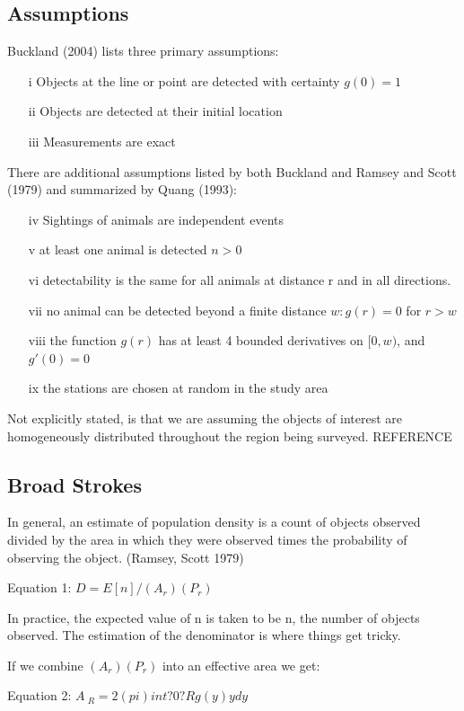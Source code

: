 \documentclass[12pt]{article}
\begin{document}
\subsection{Assumptions}
Buckland (2004) lists three primary assumptions:
\begin{enumerate}
\item[i] Objects at the line or point are detected with certainty $g(0)=1$
\item[ii] Objects are detected at their initial location
\item[iii] Measurements are exact
\end{enumerate}

There are additional assumptions listed by both Buckland and Ramsey and Scott (1979) and summarized by Quang (1993):
\begin{enumerate}
\item[iv] Sightings of animals are independent events
\item[v] at least one animal is detected $n > 0$
\item[vi] detectability is the same for all animals at distance r and in all directions.
\item[vii] no animal can be detected beyond a finite distance $w: g(r) = 0$ for $r > w$
\item[viii] the function $g(r)$ has at least 4 bounded derivatives on $[0, w)$, and $g'(0)=0$
\item[ix] the stations are chosen at random in the study area
\end{enumerate}

Not explicitly stated, is that we are assuming the objects of interest are homogeneously distributed throughout the region being surveyed. REFERENCE

\subsection{Broad Strokes}
In general, an estimate of population density is a count of objects observed divided by the area in which they were observed times the probability of observing the object. (Ramsey, Scott 1979)

Equation 1: $D = E[n]/(A_r)(P_r)$

In practice, the expected value of n is taken to be n, the number of objects observed. The estimation of the denominator is where things get tricky.

If we combine $(A_r)(P_r)$ into an effective area we get:

Equation 2: $A~_R = 2(pi) int?0?R g(y)ydy$
\end{document}
